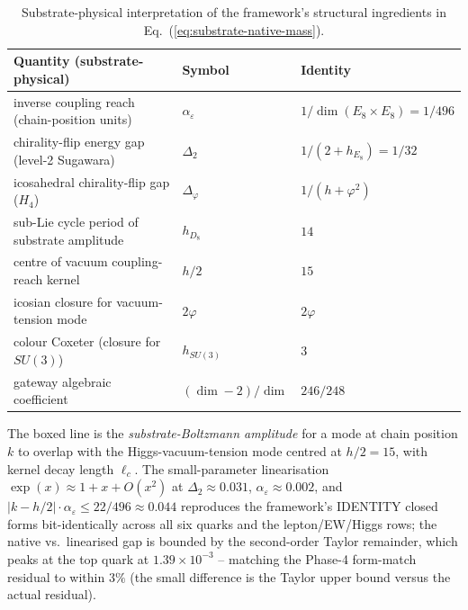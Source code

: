 ﻿\documentclass[reprint,amsmath,amssymb,aps,prd,longbibliography,floatfix]{revtex4-2}
\begin{document}
\begin{table}[h]
\centering
\caption{Substrate-physical interpretation of the framework's
structural ingredients in
Eq.~(\ref{eq:substrate-native-mass}).}
\label{tab:substrate-physical-interpretation}
\begin{tabular}{lll}
\toprule
Quantity (substrate-physical) & Symbol & Identity \\
\midrule
inverse coupling reach (chain-position units) & $\alpha_\varepsilon$ & $1/\dim(E_8 \times E_8) = 1/496$ \\
chirality-flip energy gap (level-2 Sugawara)  & $\Delta_2$ & $1/(2 + h_{E_8}) = 1/32$ \\
icosahedral chirality-flip gap ($H_4$)        & $\Delta_\varphi$ & $1/(h + \varphi^2)$ \\
sub-Lie cycle period of substrate amplitude   & $h_{D_8}$ & $14$ \\
centre of vacuum coupling-reach kernel        & $h/2$ & $15$ \\
icosian closure for vacuum-tension mode       & $2\varphi$ & $2\varphi$ \\
colour Coxeter (closure for $SU(3)$)          & $h_{SU(3)}$ & $3$ \\
gateway algebraic coefficient                 & $(\dim - 2)/\dim$ & $246/248$ \\
\bottomrule
\end{tabular}
\end{table}

The boxed line is the \emph{substrate-Boltzmann amplitude} for a mode
at chain position $k$ to overlap with the Higgs-vacuum-tension mode
centred at $h/2 = 15$, with kernel decay length $\ell_c$. The
small-parameter linearisation
$\exp(x) \approx 1 + x + O(x^2)$ at
$\Delta_2 \approx 0.031$, $\alpha_\varepsilon \approx 0.002$, and
$|k - h/2| \cdot \alpha_\varepsilon \le 22/496 \approx 0.044$
reproduces the framework's IDENTITY closed forms bit-identically
across all six quarks and the lepton/EW/Higgs rows; the native vs.\
linearised gap is bounded by the second-order Taylor remainder, which
peaks at the top quark at $1.39 \times 10^{-3}$ -- matching the
Phase-4 form-match residual to within $3\%$ (the small difference is
the Taylor upper bound versus the actual residual).
\end{document}
